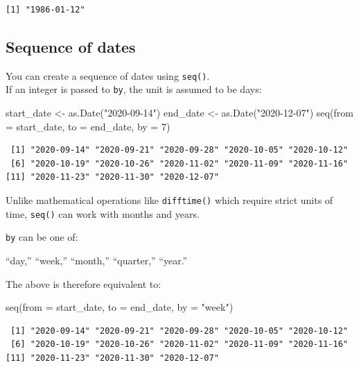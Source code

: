 \documentclass[
]{book}
\newenvironment{Shaded}{\begin{snugshade}}{\end{snugshade}}
\newcommand{\AttributeTok}[1]{\textcolor[rgb]{0.77,0.63,0.00}{#1}}
\newcommand{\DecValTok}[1]{\textcolor[rgb]{0.00,0.00,0.81}{#1}}
\newcommand{\FunctionTok}[1]{\textcolor[rgb]{0.00,0.00,0.00}{#1}}
\newcommand{\NormalTok}[1]{#1}
\newcommand{\OtherTok}[1]{\textcolor[rgb]{0.56,0.35,0.01}{#1}}
\newcommand{\StringTok}[1]{\textcolor[rgb]{0.31,0.60,0.02}{#1}}
\begin{document}
\begin{verbatim}
[1] "1986-01-12"
\end{verbatim}

\hypertarget{sequence-of-dates}{%
\subsection{Sequence of dates}\label{sequence-of-dates}}

You can create a sequence of dates using \texttt{seq()}.\\
If an integer is passed to \texttt{by}, the unit is assumed to be days:

\begin{Shaded}
\begin{Highlighting}[]
\NormalTok{start\_date }\OtherTok{\textless{}{-}} \FunctionTok{as.Date}\NormalTok{(}\StringTok{"2020{-}09{-}14"}\NormalTok{)}
\NormalTok{end\_date }\OtherTok{\textless{}{-}} \FunctionTok{as.Date}\NormalTok{(}\StringTok{"2020{-}12{-}07"}\NormalTok{)}
\FunctionTok{seq}\NormalTok{(}\AttributeTok{from =}\NormalTok{ start\_date, }\AttributeTok{to =}\NormalTok{ end\_date, }\AttributeTok{by =} \DecValTok{7}\NormalTok{)}
\end{Highlighting}
\end{Shaded}

\begin{verbatim}
 [1] "2020-09-14" "2020-09-21" "2020-09-28" "2020-10-05" "2020-10-12"
 [6] "2020-10-19" "2020-10-26" "2020-11-02" "2020-11-09" "2020-11-16"
[11] "2020-11-23" "2020-11-30" "2020-12-07"
\end{verbatim}

Unlike mathematical operations like \texttt{difftime()} which require strict units of time, \texttt{seq()} can work with months and years.

\texttt{by} can be one of:

``day,'' ``week,'' ``month,'' ``quarter,'' ``year.''

The above is therefore equivalent to:

\begin{Shaded}
\begin{Highlighting}[]
\FunctionTok{seq}\NormalTok{(}\AttributeTok{from =}\NormalTok{ start\_date, }\AttributeTok{to =}\NormalTok{ end\_date, }\AttributeTok{by =} \StringTok{"week"}\NormalTok{)}
\end{Highlighting}
\end{Shaded}

\begin{verbatim}
 [1] "2020-09-14" "2020-09-21" "2020-09-28" "2020-10-05" "2020-10-12"
 [6] "2020-10-19" "2020-10-26" "2020-11-02" "2020-11-09" "2020-11-16"
[11] "2020-11-23" "2020-11-30" "2020-12-07"
\end{verbatim}
\end{document}
